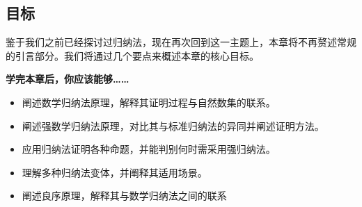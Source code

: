 \subsection{目标}

鉴于我们之前已经探讨过归纳法，现在再次回到这一主题上，本章将不再赘述常规的引言部分。我们将通过几个要点来概述本章的核心目标。

\textbf{学完本章后，你应该能够……}

\begin{itemize}
    \item 阐述数学归纳法原理，解释其证明过程与自然数集的联系。
    \item 阐述强数学归纳法原理，对比其与标准归纳法的异同并阐述证明方法。
    \item 应用归纳法证明各种命题，并能判别何时需采用强归纳法。
    \item 理解多种归纳法变体，并阐释其适用场景。
    \item 阐述良序原理，解释其与数学归纳法之间的联系
\end{itemize}
